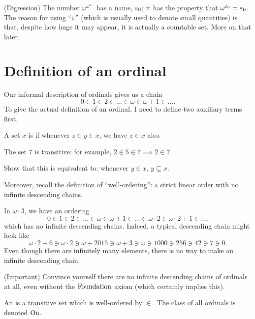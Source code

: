 \begin{remark}
	(Digression)
	The number $\omega^{\omega^{\omega^{\dots}}}$ has a name, $\varepsilon_0$;
	it has the property that $\omega^{\varepsilon_0} = \varepsilon_0$.
	The reason for using ``$\varepsilon$'' (which is usually used to denote small quantities)
	is that, despite how huge it may appear, it is actually a countable set.
	More on that later.
\end{remark}

\section{Definition of an ordinal}
Our informal description of ordinals gives us a chain
\[ 0 \in 1 \in 2 \in \dots \in \omega \in \omega+1 \in \dots. \]
To give the actual definition of an ordinal, I need to define two auxiliary terms first.
\begin{definition}
	A set $x$ is  if whenever $z \in y \in x$, we have $z \in x$ also.
\end{definition}
\begin{example}
	[$7$ is transitive]
	The set $7$ is transitive: for example, $2 \in 5 \in 7 \implies 2 \in 7$.
\end{example}
\begin{ques}
	Show that this is equivalent to: whenever $y \in x$, $y \subseteq x$.
\end{ques}
Moreover, recall the definition of ``well-ordering'': a strict linear order
with no infinite descending chains.
\begin{example}
	In $\omega \cdot 3$, we have an ordering
	\[ 0 \in 1 \in 2 \in \dots \in \omega \in \omega+1 \in \dots
		\in \omega \cdot 2 \in \omega \cdot 2 + 1 \in \dots. \]
	which has no infinite descending chains.
	Indeed, a typical descending chain might look like
	\[ \omega \cdot 2 + 6 \ni \omega \cdot 2 \ni
		\omega + 2015 \ni \omega+3 \ni \omega \ni 1000 \ni 256 \ni 42 \ni 7 \ni 0. \]
	Even though there are infinitely many elements, there is no way
	to make an infinite descending chain.
\end{example}
\begin{exercise}
	(Important)
	Convince yourself there are no infinite
	descending chains of ordinals at all,
	even without the $\mathrm{Foundation}$ axiom (which certainly implies this).
\end{exercise}

\begin{definition}
	An  is a transitive set which is well-ordered by $\in$.
	The class of all ordinals is denoted $\mathrm{On}$.
\end{definition}

